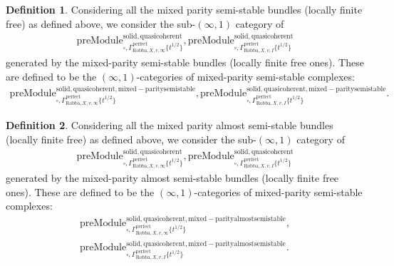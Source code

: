 \documentclass[12pt]{book}
\theoremstyle{definition}
\newtheorem{definition}{Definition}
\begin{document}
\begin{definition}
Considering all the mixed parity semi-stable bundles (locally finite free) as defined above, we consider the sub-$(\infty,1)$ category of 
\begin{align}
\mathrm{preModule}^\mathrm{solid,quasicoherent}_{\square,\Gamma^\mathrm{perfect}_{\text{Robba},X,v,\infty}\{t^{1/2}\}},
\mathrm{preModule}^\mathrm{solid,quasicoherent}_{\square,\Gamma^\mathrm{perfect}_{\text{Robba},X,v,I}\{t^{1/2}\}} 
\end{align}
generated by the mixed-parity semi-stable bundles (locally finite free ones). These are defined to be the $(\infty,1)$-categories of mixed-parity semi-stable complexes:
\begin{align}
\mathrm{preModule}^\mathrm{solid,quasicoherent,mixed-paritysemistable}_{\square,\Gamma^\mathrm{perfect}_{\text{Robba},X,v,\infty}\{t^{1/2}\}},
\mathrm{preModule}^\mathrm{solid,quasicoherent,mixed-paritysemistable}_{\square,\Gamma^\mathrm{perfect}_{\text{Robba},X,v,I}\{t^{1/2}\}}. 
\end{align}
\end{definition}


\begin{definition}
Considering all the mixed parity almost semi-stable bundles (locally finite free) as defined above, we consider the sub-$(\infty,1)$ category of 
\begin{align}
\mathrm{preModule}^\mathrm{solid,quasicoherent}_{\square,\Gamma^\mathrm{perfect}_{\text{Robba},X,v,\infty}\{t^{1/2}\}},
\mathrm{preModule}^\mathrm{solid,quasicoherent}_{\square,\Gamma^\mathrm{perfect}_{\text{Robba},X,v,I}\{t^{1/2}\}} 
\end{align}
generated by the mixed-parity almost semi-stable bundles (locally finite free ones). These are defined to be the $(\infty,1)$-categories of mixed-parity semi-stable complexes:
\begin{align}
\mathrm{preModule}^\mathrm{solid,quasicoherent,mixed-parityalmostsemistable}_{\square,\Gamma^\mathrm{perfect}_{\text{Robba},X,v,\infty}\{t^{1/2}\}},\\
\mathrm{preModule}^\mathrm{solid,quasicoherent,mixed-parityalmostsemistable}_{\square,\Gamma^\mathrm{perfect}_{\text{Robba},X,v,I}\{t^{1/2}\}}. 
\end{align}
\end{definition}
\end{document}
